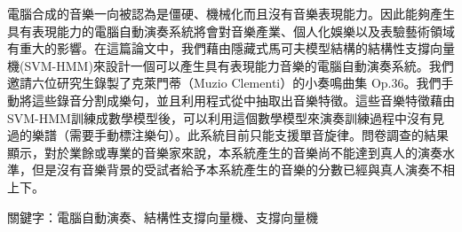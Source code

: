 \begin{abstractCH}

  電腦合成的音樂一向被認為是僵硬、機械化而且沒有音樂表現能力。因此能夠產生具有表現能力的電腦自動演奏系統將會對音樂產業、個人化娛樂以及表驗藝術領域有重大的影響。在這篇論文中，我們藉由隱藏式馬可夫模型結構的結構性支撐向量機(SVM-HMM)來設計一個可以產生具有表現能力音樂的電腦自動演奏系統。我們邀請六位研究生錄製了克萊門蒂（Muzio Clementi）的小奏鳴曲集 Op.36。我們手動將這些錄音分割成樂句，並且利用程式從中抽取出音樂特徵。這些音樂特徵藉由SVM-HMM訓練成數學模型後，可以利用這個數學模型來演奏訓練過程中沒有見過的樂譜（需要手動標注樂句）。此系統目前只能支援單音旋律。問卷調查的結果顯示，對於業餘或專業的音樂家來說，本系統產生的音樂尚不能達到真人的演奏水準，但是沒有音樂背景的受試者給予本系統產生的音樂的分數已經與真人演奏不相上下。
  
  關鍵字：電腦自動演奏、結構性支撐向量機、支撐向量機

\end{abstractCH}
